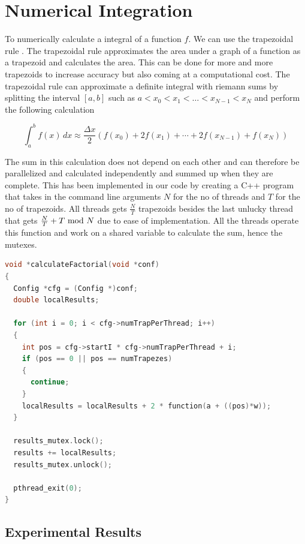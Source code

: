 \section{Numerical Integration}

To numerically calculate a integral of a function $f$. We can
use the trapezoidal rule \cite{trapezoidal}. The trapezoidal rule 
approximates the area under a graph of a function as a trapezoid and 
calculates the area. This can be done for more and more trapezoids to increase
accuracy but also coming at a computational cost. The trapezoidal rule can 
approximate a definite integral with riemann sums by splitting the interval 
$[a, b]$ such as $a < x_0 < x_1 < \dots < x_{N-1} < x_N$ and perform the 
following calculation

\begin{equation}
    \int_a^b f(x) \, dx \approx \frac{\Delta x}{2} \left(f(x_0) + 2f(x_1) + \cdots + 2f(x_{N-1}) + f(x_N)\right)
\end{equation}

The sum in this calculation does not depend on each other and can therefore be
parallelized and calculated independently and summed up when they are complete.
This has been implemented in our code by creating a C++ program that takes in
the command line arguments $N$ for the no of threads and $T$ for the no of
trapezoids. All threads gets $\frac{N}{T}$ trapezoids besides the last unlucky
thread that gets $\frac{N}{T} + T \ \mathrm{mod}\ N$ due to ease of implementation. All
the threads operate this function and work on a shared variable to calculate 
the sum, hence the mutexes.

\begin{lstlisting}[language=C++, caption=non-determinism.cpp]
void *calculateFactorial(void *conf)
{
  Config *cfg = (Config *)conf;
  double localResults;

  for (int i = 0; i < cfg->numTrapPerThread; i++)
  {
    int pos = cfg->startI * cfg->numTrapPerThread + i;
    if (pos == 0 || pos == numTrapezes)
    {
      continue;
    }
    localResults = localResults + 2 * function(a + ((pos)*w));
  }

  results_mutex.lock();
  results += localResults;
  results_mutex.unlock();

  pthread_exit(0);
}
\end{lstlisting}

\subsection{Experimental Results}

